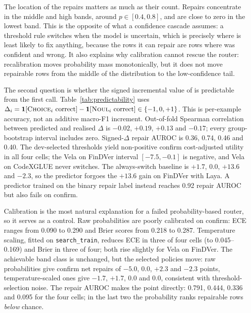 The location of the repairs matters as much as their count. Repairs
concentrate in the middle and high bands,
around $p\in[0.4,0.8]$, and are close to zero in the lowest band. This is the
opposite of what a confidence cascade assumes: a threshold rule switches when
the model is uncertain, which is precisely where \choice{} is least likely to
fix anything, because the rows it can repair are rows where \noul{} was
confident and wrong. It also explains why calibration cannot rescue the router:
recalibration moves probability mass monotonically, but it does not move
repairable rows from the middle of the distribution to the low-confidence tail.



The second question is whether the signed incremental value of \choice{} is
predictable from the first call. Table~\ref{tab:predictability} uses
$\Delta_i=\mathbf{1}[\textsc{Choice}_i\text{ correct}]-
\mathbf{1}[\textsc{Noul}_i\text{ correct}]\in\{-1,0,+1\}$. This is per-example
accuracy, not an additive macro-F1 increment. Out-of-fold Spearman
correlation between predicted and realised $\Delta$ is $-0.02$, $+0.19$,
$+0.13$ and $-0.17$; every group-bootstrap interval includes zero.
Signed-$\Delta$ repair AUROC is 0.36, 0.74, 0.46 and 0.40. The dev-selected
thresholds yield non-positive confirm cost-adjusted utility in all four cells;
the Vela on FinDVer interval $[-7.5,-0.1]$ is negative, and Vela on CodeXGLUE
never switches. The always-switch baseline is $+1.7$, $0.0$, $+13.6$ and
$-2.3$, so the predictor forgoes the $+13.6$ gain on FinDVer with Laya. A
predictor trained on the binary repair label instead reaches 0.92 repair AUROC
but also fails on confirm.

Calibration is the most natural explanation for a failed probability-based
router, so it serves as a control. Raw probabilities are poorly calibrated on
confirm: ECE ranges from 0.090 to 0.290
and Brier scores \citep{brier1950verification} from 0.218 to 0.287. Temperature scaling, fitted on
\texttt{search\_train}, reduces ECE in three of four cells (to 0.045--0.169) and
Brier in three of four; both rise slightly for Vela on FinDVer. The achievable band
class is unchanged, but the selected policies move: raw probabilities give
confirm net repairs of $-5.0$, $0.0$, $+2.3$ and $-2.3$ points, temperature-scaled
ones give $-1.7$, $+1.7$, $0.0$ and $0.0$, consistent with threshold-selection
noise. The repair AUROC makes the point directly: 0.791, 0.444, 0.336 and 0.095
for the four cells; in the last two the probability ranks repairable rows
\emph{below} chance.

